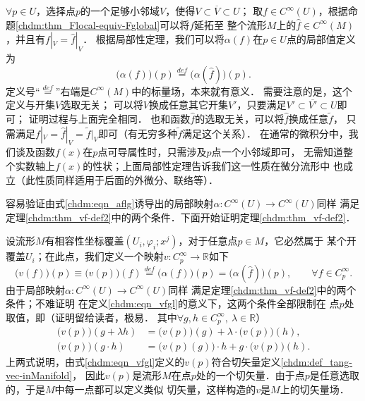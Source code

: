$\forall p\in U$，选择点$p$的一个足够小邻域$V$，使得$V\subset \overline{V} \subset U$；
取$f\in C^\infty(U)$，根据命题\ref{chdm:thm_Flocal-equiv-Fglobal}可以将$f$延拓至
整个流形$M$上的$\hat{f}\in C^\infty(M)$，并且有$f|_V= \hat{f}|_V$．
根据局部性定理，我们可以将$\alpha(f)$在$p\in U$点的局部值定义为
\begin{equation}\label{chdm:eqn_aflg}
    \bigl(\alpha(f)\bigr)(p) \overset{def}{=} \bigl(\alpha(\hat{f})\bigr)(p) .
\end{equation}
定义号“$\overset{def}{=}$”右端是$C^\infty(M)$中的标量场，本来就有意义．
需要注意的是，这个定义与开集$V$选取无关；
可以将$V$换成任意其它开集$V'$，只要满足$V' \subset \overline{V'} \subset U$即可；
证明过程与上面完全相同．
也和函数$\hat{f}$的选取无关，可以将$\hat{f}$换成任意$\tilde{f}$，
只需满足$f|_V=\hat{f}|_V=\tilde{f}|_V$即可（有无穷多种$\tilde{f}$满足这个关系）．
在通常的微积分中，我们谈及函数$f(x)$在$p$点可导属性时，只需涉及$p$点一个小邻域即可，
无需知道整个实数轴上$f(x)$的性状；上面局部性定理告诉我们这一性质在微分流形中
也成立（此性质同样适用于后面的外微分、联络等）．

容易验证由式\eqref{chdm:eqn_aflg}诱导出的局部映射$\alpha:C^\infty(U)\to C^\infty(U)$同样
满足定理\ref{chdm:thm_vf-def2}中的两个条件．下面开始证明定理\ref{chdm:thm_vf-def2}．

设流形$M$有相容性坐标覆盖$(U_i,\varphi_i;x^j)$，对于任意点$p\in M$，它必然属于
某个开覆盖$U_i$；在此点，我们定义一个映射$v:C^\infty_p \to \mathbb{R}$如下
\begin{equation}\label{chdm:eqn_vfgl}
    \bigl(v(f)\bigr)(p) \equiv \bigl(v(p)\bigr)(f) \overset{def}{=} 
      \bigl(\alpha({f})\bigr)(p) =\bigl(\alpha(\hat{f})\bigr)(p) , \qquad \forall f\in C^\infty_p .
\end{equation}
由于局部映射$\alpha:C^\infty(U)\to C^\infty(U)$同样
满足定理\ref{chdm:thm_vf-def2}中的两个条件；不难证明
在定义\eqref{chdm:eqn_vfgl}的意义下，这两个条件全部限制在
点$p$处取值，即（证明留给读者，极易．
其中$\forall g,h \in C^\infty_p,\ \lambda \in \mathbb{R} $）
\begin{equation}\label{chdm:eqn_tmpvfg}
\begin{aligned}
    \bigl(v(p)\bigr) (g+\lambda h) &= \bigl(v(p)\bigr) (g) + \lambda\cdot \bigl(v(p)\bigr) (h) , \\
    \bigl(v(p)\bigr) (g\cdot h) &= \bigl(v(p)(g)\bigr) \cdot h + g\cdot\bigl(v(p)\bigr) ( h) .
\end{aligned}
\end{equation}
上两式说明，由式\eqref{chdm:eqn_vfgl}定义的$v(p)$符合切矢量定义\ref{chdm:def_tang-vec-inManifold}，
因此$v(p)$是流形$M$在点$p$处的一个切矢量．由于点$p$是任意选取的，于是$M$中每一点都可以定义类似
切矢量，这样构造的$v$是$M$上的{\kaishu 切矢量场}．

